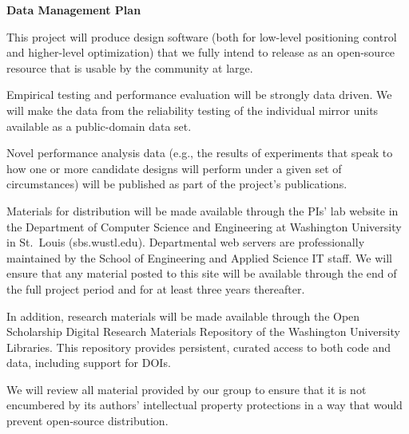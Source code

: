 \documentclass[12pt]{article}
\begin{document}
\pagestyle{empty}
\thispagestyle{empty}

\begin{center}
\textbf{\Large Data Management Plan}
\end{center}

This project will produce design software (both for low-level positioning
control and higher-level optimization)
that we fully intend to release as an open-source resource that
is usable by the community at large.

Empirical testing and performance evaluation will be strongly data
driven.  We will make the data from the reliability testing of the
individual mirror units available as a public-domain data set.

Novel performance analysis data (e.g., the results of experiments
that speak to how one or more candidate designs will perform under
a given set of circumstances) will be published as part of the
project's publications.

Materials for distribution will be made available through the PIs' lab
website in the Department of Computer Science and Engineering at
Washington University in St.\ Louis (sbs.wustl.edu).
Departmental web servers
are professionally maintained by the School of Engineering and Applied
Science IT staff.
We will ensure that any material posted to this site will be available
through the end of the full project period and for at least three
years thereafter.

In addition, research materials will be made available through the
Open Scholarship Digital Research Materials Repository of the 
Washington University Libraries.  This repository provides persistent,
curated access to both code and data, including support for DOIs.

We will review all material provided by our group to ensure that it is
not encumbered by its authors' intellectual property protections in a
way that would prevent open-source distribution.
\end{document}
